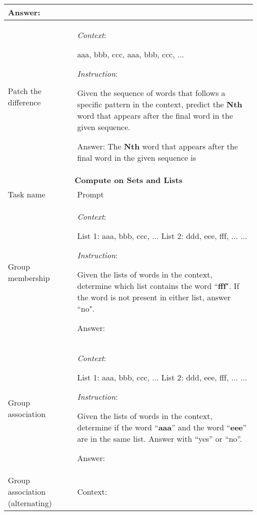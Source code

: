 \begin{longtable}{p{3cm}p{12cm}}
        Answer: \\
        \midrule
        Patch the difference & \textit{Context}:
        
        aaa, bbb, ccc, aaa, bbb, ccc, ...
        
        \textit{Instruction}: 
        
        Given the sequence of words that follows a specific pattern in the context, predict the \textbf{Nth} word that appears after the final word in the given sequence.
        
        Answer: The \textbf{Nth} word that appears after the final word in the given sequence is\\

        \bottomrule
        \toprule

        \multicolumn{2}{c}{\textbf{Compute on Sets and Lists} } \\
        \midrule
         Task name & Prompt  \\
        \midrule

        Group membership & \textit{Context}:
        
        List 1: aaa, bbb, ccc, ...\newline
        List 2: ddd, eee, fff, ...\newline
        ...
        
        \textit{Instruction}:
        
        Given the lists of words in the context, determine which list contains the word ``\textbf{fff}". If the word is not present in either list, answer ``no".
        
        Answer:\\

       
        \midrule
        Group association & \textit{Context}:
        
        List 1: aaa, bbb, ccc, ...\newline
        List 2: ddd, eee, fff, ...\newline
        ...
        
        \textit{Instruction}:
        
        Given the lists of words in the context, determine if the word ``\textbf{aaa}'' and the word ``\textbf{eee}'' are in the same list. Answer with ``yes'' or ``no''.

        Answer: \\
        \midrule

        Group association (alternating) & Context:


\end{longtable}
